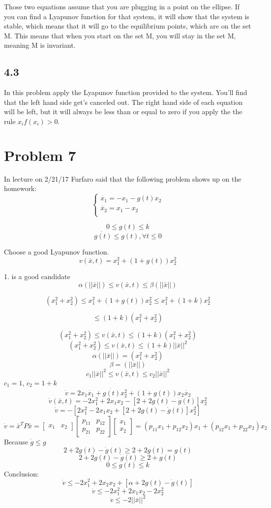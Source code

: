 \documentclass[12pt]{article}
\begin{document}
Those two equations assume that you are plugging in a point on the ellipse. If you can find a Lyapunov function for that system, it will show that the system is stable, which means that it will go to the equilibrium points, which are on the set M. This means that when you start on the set M, you will stay in the set M, meaning M is invariant.  

\subsection*{4.3}
In this problem apply the Lyapunov function provided to the system. You'll find that the left hand side get's canceled out. The right hand side of each equation will be left, but it will always be less than or equal to zero if you apply the the rule $x_if(x_i)>0$.

\section*{Problem 7}
In lecture on 2/21/17 Furfaro said that the following problem shows up on the homework:
$$\begin{cases}\dot{x_1}=-x_1-g(t)x_2\\ 
\dot{x_2}=x_1-x_2\\
\end{cases}$$ 

$$0\leq g(t)\leq k$$
$$\dot{g(t)} \leq g(t), \forall t \leq 0$$

Choose a good Lyapunov function. 
$$v(\bar{x},t)=x_1^2+(1+g(t))x_2^2$$

1. is a good candidate\\
$$\alpha(||\bar{x}||)\leq v(\bar{x},t)\leq \beta(||\bar{x}||)$$

$$(x_1^2+x_2^2)\leq x_1^2+(1+g(t))x_2^2\leq x_1^2+(1+k)x_2^2$$

$$\leq(1+k)(x_1^2+x_2^2)$$

$$(x_1^2+x_2^2)\leq v(\bar{x},t)\leq (1+k)(x_1^2+x_2^2)$$
$$(x_1^2+x_2^2)\leq v(\bar{x},t)\leq (1+k)||\bar{x}||^2$$
$$\alpha(||\bar{x}||)=(x_1^2+x_2^2)$$
$$\beta=(||\bar{x}||)$$
$$c_1||\bar{x}||^2\leq v(\bar{x},t)\leq c_2||\bar{x}||^2$$
$c_1=1$, $c_2=1+k$
$$\dot{v}=2x_1\dot{x_1}+\dot{g(t)}x_2^2+(1+g(t))x_2\dot{x_2}$$
$$\dot{v}(\bar{x},t)=-2x_1^2+2x_1x_2-[2+2g(t)-\dot{g}(t)]x_2^2$$
$$\dot{v}=-[2x_1^2-2x_1x_2+[2+2g(t)-\dot{g}(t)]x_2^2]$$
$$\dot{v}=\bar{x}^TP\bar{x}=\begin{bmatrix} x_1 & x_2 \end{bmatrix}
\begin{bmatrix} p_{11} & p_{12} \\
p_{21} & p_{22} \end{bmatrix}\begin{bmatrix} x_1 \\ x_2 \end{bmatrix} = (p_{11}x_1+p_{12}x_2)x_1+(p_{12}x_1+p_{22}x_2)x_2$$
Because $\dot{g}\leq g$
$$2+2g(t)-\dot{g}(t)\geq 2+2g(t)=g(t)$$
$$2+2g(t)-\dot{g}(t)\geq 2+g(t)$$
$$0\leq g(t) \leq k$$
Conclusion:
$$\dot{v}\leq -2x_1^2+2x_2x_2+[\alpha+2g(t)-\dot{g}(t)]$$
$$\dot{v}\leq -2x_1^2+2x_1x_2-2x_2^2$$
$$\dot{v}\leq -2||\bar{x}||^2$$
\end{document}
